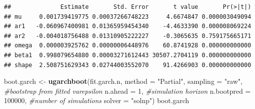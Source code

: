 \documentclass[
]{book}
\newenvironment{Shaded}{\begin{snugshade}}{\end{snugshade}}
\newcommand{\AttributeTok}[1]{\textcolor[rgb]{0.13,0.29,0.53}{#1}}
\newcommand{\CommentTok}[1]{\textcolor[rgb]{0.56,0.35,0.01}{\textit{#1}}}
\newcommand{\DecValTok}[1]{\textcolor[rgb]{0.00,0.00,0.81}{#1}}
\newcommand{\FunctionTok}[1]{\textcolor[rgb]{0.13,0.29,0.53}{\textbf{#1}}}
\newcommand{\NormalTok}[1]{#1}
\newcommand{\OtherTok}[1]{\textcolor[rgb]{0.56,0.35,0.01}{#1}}
\newcommand{\SpecialCharTok}[1]{\textcolor[rgb]{0.81,0.36,0.00}{\textbf{#1}}}
\newcommand{\StringTok}[1]{\textcolor[rgb]{0.31,0.60,0.02}{#1}}
\begin{document}
\begin{Shaded}
\end{Shaded}

\begin{verbatim}
##              Estimate       Std. Error       t value       Pr(>|t|)
## mu     0.001739419775 0.00037266748223     4.6674847 0.000003049094
## ar1   -0.060967400981 0.01365959454340    -4.4633390 0.000008069224
## ar2   -0.004018756488 0.01310905222227    -0.3065635 0.759175665171
## omega  0.000003925762 0.00000006448976    60.8741928 0.000000000000
## beta1  0.998079654880 0.00003271612443 30507.2704119 0.000000000000
## shape  2.508751629343 0.02744003552070    91.4266903 0.000000000000
\end{verbatim}

\begin{Shaded}
\begin{Highlighting}[]
\NormalTok{boot.garch }\OtherTok{\textless{}{-}} \FunctionTok{ugarchboot}\NormalTok{(fit.garch.n,}
                         \AttributeTok{method =} \StringTok{"Partial"}\NormalTok{,}
                         \AttributeTok{sampling =} \StringTok{"raw"}\NormalTok{,  }\CommentTok{\#bootstrap from fitted varepsilon}
                         \AttributeTok{n.ahead =} \DecValTok{1}\NormalTok{,          }\CommentTok{\#simulation horizon}
                         \AttributeTok{n.bootpred =} \DecValTok{100000}\NormalTok{, }\CommentTok{\#number of simulations }
                         \AttributeTok{solver =} \StringTok{"solnp"}\NormalTok{)}
\NormalTok{boot.garch}
\end{Highlighting}
\end{Shaded}
\end{document}
